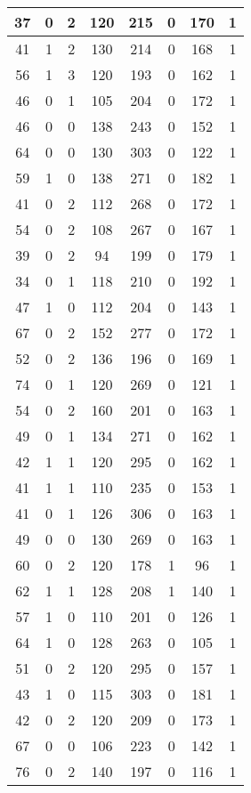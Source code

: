 \documentclass{article}
\begin{document}
\begin{longtable}{|c|c|c|c|c|c|c|c|}
37 & 0 & 2 & 120 & 215 & 0 & 170 & 1 \\ \hline
41 & 1 & 2 & 130 & 214 & 0 & 168 & 1 \\ \hline
56 & 1 & 3 & 120 & 193 & 0 & 162 & 1 \\ \hline
46 & 0 & 1 & 105 & 204 & 0 & 172 & 1 \\ \hline
46 & 0 & 0 & 138 & 243 & 0 & 152 & 1 \\ \hline
64 & 0 & 0 & 130 & 303 & 0 & 122 & 1 \\ \hline
59 & 1 & 0 & 138 & 271 & 0 & 182 & 1 \\ \hline
41 & 0 & 2 & 112 & 268 & 0 & 172 & 1 \\ \hline
54 & 0 & 2 & 108 & 267 & 0 & 167 & 1 \\ \hline
39 & 0 & 2 & 94 & 199 & 0 & 179 & 1 \\ \hline
34 & 0 & 1 & 118 & 210 & 0 & 192 & 1 \\ \hline
47 & 1 & 0 & 112 & 204 & 0 & 143 & 1 \\ \hline
67 & 0 & 2 & 152 & 277 & 0 & 172 & 1 \\ \hline
52 & 0 & 2 & 136 & 196 & 0 & 169 & 1 \\ \hline
74 & 0 & 1 & 120 & 269 & 0 & 121 & 1 \\ \hline
54 & 0 & 2 & 160 & 201 & 0 & 163 & 1 \\ \hline
49 & 0 & 1 & 134 & 271 & 0 & 162 & 1 \\ \hline
42 & 1 & 1 & 120 & 295 & 0 & 162 & 1 \\ \hline
41 & 1 & 1 & 110 & 235 & 0 & 153 & 1 \\ \hline
41 & 0 & 1 & 126 & 306 & 0 & 163 & 1 \\ \hline
49 & 0 & 0 & 130 & 269 & 0 & 163 & 1 \\ \hline
60 & 0 & 2 & 120 & 178 & 1 & 96 & 1 \\ \hline
62 & 1 & 1 & 128 & 208 & 1 & 140 & 1 \\ \hline
57 & 1 & 0 & 110 & 201 & 0 & 126 & 1 \\ \hline
64 & 1 & 0 & 128 & 263 & 0 & 105 & 1 \\ \hline
51 & 0 & 2 & 120 & 295 & 0 & 157 & 1 \\ \hline
43 & 1 & 0 & 115 & 303 & 0 & 181 & 1 \\ \hline
42 & 0 & 2 & 120 & 209 & 0 & 173 & 1 \\ \hline
67 & 0 & 0 & 106 & 223 & 0 & 142 & 1 \\ \hline
76 & 0 & 2 & 140 & 197 & 0 & 116 & 1 \\ \hline

\end{longtable}
\end{document}
